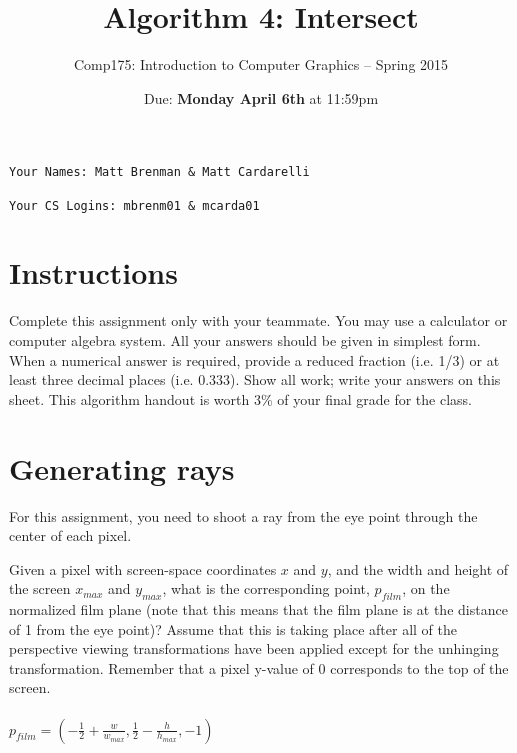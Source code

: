 \documentclass[10pt,twocolumn]{article}
\title{\Huge{\bf Algorithm 4: Intersect}}
\author{Comp175: Introduction to Computer Graphics -- Spring 2015}
\date{Due:  {\bf Monday April 6th} at 11:59pm}                                           %
\begin{document}
\maketitle

\begin{verbatim}
Your Names: Matt Brenman & Matt Cardarelli

Your CS Logins: mbrenm01 & mcarda01
\end{verbatim}

\section{Instructions}
Complete this assignment only with your teammate. You may use a calculator or computer algebra system. All your answers should be given in simplest form. When a numerical answer is required, provide a reduced fraction (i.e. 1/3) or at least three decimal places (i.e. 0.333). Show all work; write your answers on this sheet. This algorithm handout is worth 3\% of your final grade for the class.

\section{Generating rays}
For this assignment, you need to shoot a ray from the eye point through the center of each pixel.

\begin{framed}
\noindent {\bf [1 point]} Given a pixel with screen-space coordinates $x$ and $y$, and the width and height of the screen $x_{max}$ and $y_{max}$, what is the corresponding point, $p_{film}$, on the normalized film plane (note that this means that the film plane is at the distance of 1 from the eye point)? Assume that this is taking place after all of the perspective viewing transformations have been applied except for the unhinging transformation. Remember that a pixel y-value of 0 corresponds to the top of the screen.\\\\
$p_{film} = (-\frac{1}{2} + \frac{w}{w_{max}}, \frac{1}{2} - \frac{h}{h_{max}}, -1)$\\\\
\end{framed}
\end{document}
